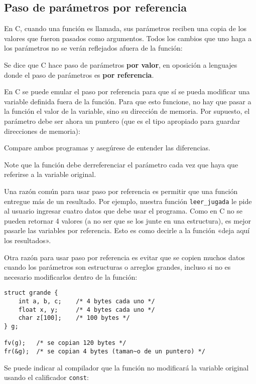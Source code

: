 \subsection{Paso de parámetros por referencia}

En C, cuando una función es llamada, sus parámetros reciben una copia de
los valores que fueron pasados como argumentos. Todos los cambios que
uno haga a los parámetros no se verán reflejados afuera de la función:

Se dice que C hace paso de parámetros \textbf{por valor}, en oposición a
lenguajes donde el paso de parámetros es \textbf{por referencia}.

En C se puede emular el paso por referencia para que sí se pueda
modificar una variable definida fuera de la función. Para que esto
funcione, no hay que pasar a la función el valor de la variable, sino su
dirección de memoria. Por supuesto, el parámetro debe ser ahora un
puntero (que es el tipo apropiado para guardar direcciones de memoria):

Compare ambos programas y asegúrese de entender las diferencias.

Note que la función debe derreferenciar el parámetro cada vez que haya
que referirse a la variable original.

Una razón común para usar paso por referencia es permitir que una
función entregue más de un resultado. Por ejemplo, nuestra función
\lstinline!leer_jugada! le pide al usuario ingresar cuatro datos que
debe usar el programa. Como en C no se pueden retornar 4 valores (a no
ser que se los junte en una estructura), es mejor pasarle las variables
por referencia. Esto es como decirle a la función «deja aquí los
resultados».

Otra razón para usar paso por referencia es evitar que se copien muchos
datos cuando los parámetros son estructuras o arreglos grandes, incluso
si no es necesario modificarlos dentro de la función:

\begin{lstlisting}
struct grande {
    int a, b, c;    /* 4 bytes cada uno */
    float x, y;     /* 4 bytes cada uno */
    char z[100];    /* 100 bytes */
} g;

fv(g);   /* se copian 120 bytes */
fr(&g);  /* se copian 4 bytes (taman~o de un puntero) */
\end{lstlisting}

Se puede indicar al compilador que la función no modificará la variable
original usando el calificador \lstinline!const!:

